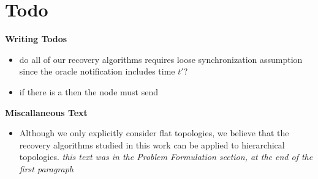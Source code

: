 \section{Todo}

{\bf Writing Todos}

{\it 
\begin{itemize}

	\item do all of our recovery algorithms requires loose synchronization assumption since the oracle notification includes time $t'$?

	\item if there is a \lcd then the node must send

\end{itemize}
}

{\bf Miscallaneous Text}

\begin{itemize}
	\item Although we only explicitly consider flat topologies, we believe that the recovery algorithms studied in this work can be applied to hierarchical topologies. 
	{\it this text was in the Problem Formulation section, at the end of the first paragraph}

\end{itemize}


